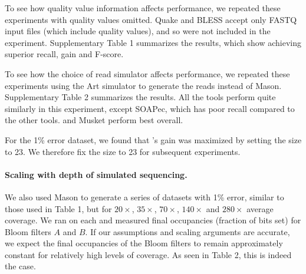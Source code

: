 \documentclass{bmcart}
\begin{document}
To see how quality value information affects performance, we repeated these experiments with quality values omitted.
Quake and BLESS accept only FASTQ input files (which include quality values), and so were not included in the experiment.
Supplementary Table 1 summarizes the results, which show \tool achieving superior recall, gain and F-score.

To see how the choice of read simulator affects performance, we repeated these experiments using the Art \cite{huang2012art} simulator to generate the reads instead of Mason.
Supplementary Table 2 summarizes the results.
All the tools perform quite similarly in this experiment, except SOAPec, which has poor recall compared to the other tools.
\tool and Musket perform best overall.

For the 1\% error dataset, we found that \tool's gain was maximized by setting the \kmer size to 23.  We therefore fix the \kmer size to 23 for subsequent experiments.

\paragraph{Scaling with depth of simulated sequencing.} We also used Mason to generate a series of datasets with 1\% error, similar to those used in Table 1, but for $20\times$, $35\times$, $70\times$, $140\times$ and $280\times$ average coverage.  We ran \tool on each and measured final occupancies (fraction of bits set) for Bloom filters $A$ and $B$.  If our assumptions and scaling arguments are accurate, we expect the final occupancies of the Bloom filters to remain approximately constant for relatively high levels of coverage.  As seen in Table 2, this is indeed the case.  


\end{document}
